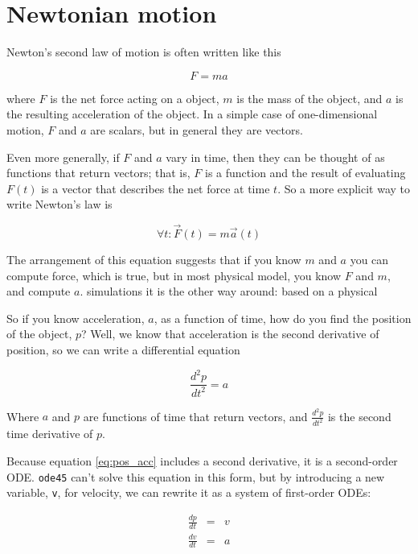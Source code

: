 \documentclass{book}
\begin{document}
\section{Newtonian motion}

Newton's second law of motion is often written like this

\begin{equation}
F = ma
\end{equation}

where $F$ is the net force acting on a object, $m$ is the mass
of the object, and $a$ is the resulting acceleration of the object.
In a simple case of one-dimensional motion,
$F$ and $a$ are scalars, but in general they are vectors.

Even more generally, if $F$ and $a$ vary in time, then they can
be thought of as functions that return vectors; that is, $F$ is
a function and the result of evaluating $F(t)$ is a vector that
describes the net force at time $t$.  So a more explicit way to
write Newton's law is

\begin{equation}
\forall t: \vec{F}(t) = m \vec{a}(t)
\end{equation}

The arrangement of this equation suggests that if you know $m$ and $a$
you can compute force, which is true, but in most physical
model, you know $F$ and $m$, and compute $a$.
simulations it is the other way around:  based on a physical

So if you know acceleration, $a$, as a function of time, how do you
find the position of the object, $p$?  Well, we know that acceleration
is the second derivative of position, so we can write a differential
equation

\begin{equation}\label{eq:pos_acc}
\frac{d^2p}{dt^2} = a
\end{equation}

Where $a$ and $p$ are functions of time that return vectors,
and $\frac{d^2p}{dt^2}$ is the second time derivative of $p$.

Because equation \eqref{eq:pos_acc} includes a second derivative, it is
a second-order ODE.  {\tt ode45} can't solve this equation in this form,
but by introducing a new variable, {\tt v}, for velocity, we can rewrite
it as a system of first-order ODEs:

\begin{eqnarray}
    \label{eq:pos_vel}
    \frac{dp}{dt} &=& v \\
    \label{eq:vel_acc}
    \frac{dv}{dt} &=& a
\end{eqnarray}
\end{document}
